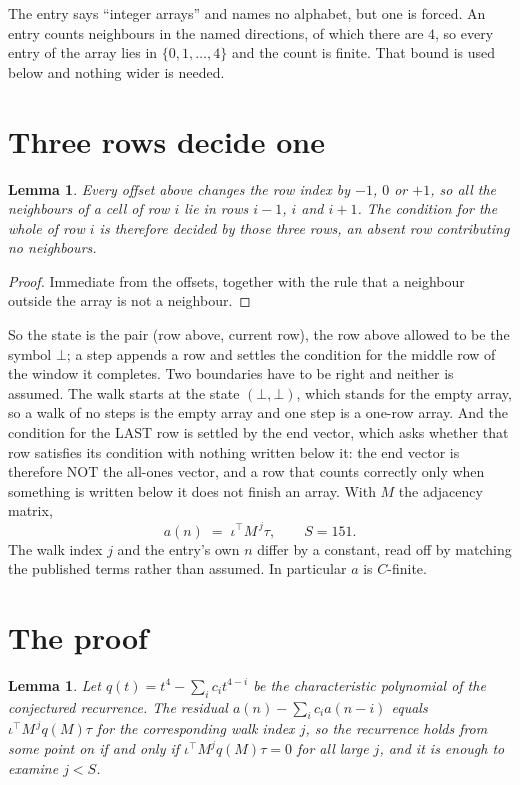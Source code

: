 \documentclass[11pt,a4paper]{article}
\theoremstyle{plain}
\newtheorem{lemma}[theorem]{Lemma}
\theoremstyle{definition}
\begin{document}
The entry says ``integer arrays'' and names no alphabet, but one is forced. An entry counts
neighbours in the named directions, of which there are $4$, so every entry of the array
lies in $\{0,1,\dots,4\}$ and the count is finite. That bound is used below and
nothing wider is needed.

\section{Three rows decide one}

\begin{lemma}\label{lem:win}
Every offset above changes the row index by $-1$, $0$ or $+1$, so all the neighbours of a cell
of row $i$ lie in rows $i-1$, $i$ and $i+1$. The condition for the whole of row $i$ is
therefore decided by those three rows, an absent row contributing no neighbours.
\end{lemma}

\begin{proof}
Immediate from the offsets, together with the rule that a neighbour outside the array is not a
neighbour.
\end{proof}

So the state is the pair (row above, current row), the row above allowed to be the symbol
$\bot$; a step appends a row and settles the condition for the middle row of the window it
completes. Two boundaries have to be right and neither is assumed. The walk starts at the state
$(\bot,\bot)$, which stands for the empty array, so a walk of no steps is the empty array and
one step is a one-row array. And the condition for the LAST row is settled by the end vector,
which asks whether that row satisfies its condition with nothing written below it: the end
vector is therefore NOT the all-ones vector, and a row that counts correctly only when
something is written below it does not finish an array. With $M$ the adjacency matrix,
\[
a(n)\;=\;\iota^{\!\top}M^{\,j}\tau ,\qquad S=151.
\]
The walk index $j$ and the entry's own $n$ differ by a constant, read off by matching the
published terms rather than assumed. In particular $a$ is $C$-finite.

\section{The proof}

\begin{lemma}\label{lem:crit}
Let $q(t)=t^{4}-\sum_i c_it^{4-i}$ be the characteristic polynomial of the
conjectured recurrence. The residual $a(n)-\sum_ic_ia(n-i)$ equals
$\iota^{\!\top}M^{\,j}q(M)\tau$ for the corresponding walk index $j$, so the recurrence
holds from some point on if and only if $\iota^{\!\top}M^{j}q(M)\tau=0$ for all large $j$,
and it is enough to examine $j<S$.
\end{lemma}
\end{document}
